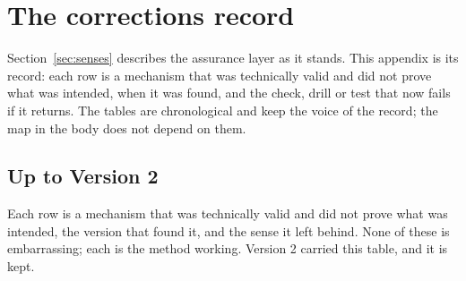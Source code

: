 \section{The corrections record}
\label{app:corrections}

Section~\ref{sec:senses} describes the assurance layer as it stands. This appendix is its record:
each row is a mechanism that was technically valid and did not prove what was intended, when it was
found, and the check, drill or test that now fails if it returns. The tables are chronological and
keep the voice of the record; the map in the body does not depend on them.

\subsection*{Up to Version 2}

Each row is a mechanism that was technically valid and did not prove what was intended, the version
that found it, and the sense it left behind. None of these is embarrassing; each is the method
working. Version 2 carried this table, and it is kept.


